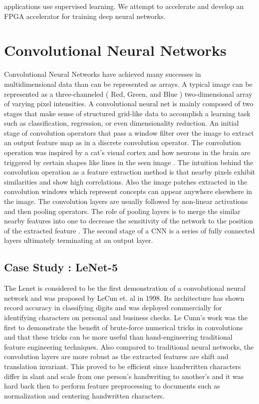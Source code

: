 applications use supervised learning. We attempt to accelerate and develop an FPGA accelerator for training deep neural networks. 

\section{Convolutional Neural Networks}

Convolutional Neural Networks have achieved many successes in multidimensional data than can be represented as arrays. A typical image can be represented as a three-channeled ( Red, Green, and Blue ) two-dimensional array of varying pixel intensities. A convolutional neural net is mainly composed of two stages that make sense of structured grid-like data to accomplish a learning task such as classification, regression, or even dimensionality reduction. An initial stage of convolution operators that pass a window filter over the image to extract an output feature map as in a discrete convolution operator. The convolution operation was inspired by a cat’s visual cortex and how neurons in the brain are triggered by certain shapes like lines in the seen image \cite{hubel1962receptive}. The intuition behind the convolution operation as a feature extraction method is that nearby pixels exhibit similarities and show high correlations. Also the image patches extracted in the convolution windows which represent concepts can appear anywhere elsewhere in the image. The convolution layers are usually followed by non-linear activations and then pooling operators. The role of pooling layers is to merge the similar nearby features into one to decrease the sensitivity of the network to the position of the extracted feature \cite{szegedy2015going}. The second stage of a CNN is a series of fully connected layers ultimately terminating at an output layer.

\subsection{Case Study : LeNet-5}
The Lenet \cite{lenet} is considered to be the first demonstration of a convolutional neural network and was proposed by LeCun et. al \cite{lenet} in 1998. Its architecture has shown record accuracy in classifying digits and was deployed commercially for identifying characters on personal and business checks. Le Cunn’s work was the first to demonstrate the benefit of brute-force numerical tricks in convolutions and that these tricks can be more useful than hand-engineering traditional feature engineering techniques. Also compared to traditional neural networks, the convolution layers are more robust as the extracted features are shift and translation invariant. This proved to be efficient since handwritten characters differ in slant and scale from one person’s handwriting to another’s and it was hard back then to perform feature preprocessing to documents such as normalization and centering handwritten characters.

